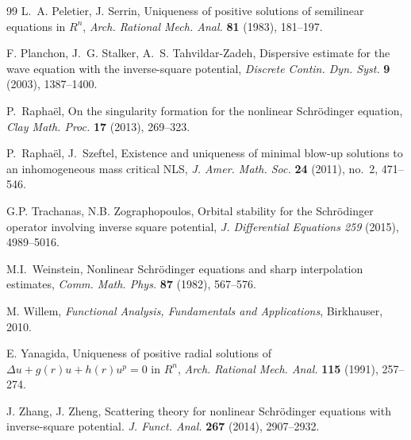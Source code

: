 \documentclass[reqno]{amsart}
\theoremstyle{plain}
\theoremstyle{definition}
\numberwithin{equation}{section}
\begin{document}
\begin{thebibliography}{99}
L.~A. Peletier, J. Serrin,
Uniqueness of positive solutions of semilinear equations in $R^n$,
{\it Arch. Rational Mech. Anal.} {\bf 81} (1983), 181--197.


F. Planchon, J.~G. Stalker, A.~S. Tahvildar-Zadeh,
Dispersive estimate for the wave equation with the inverse-square potential, 
{\it Discrete Contin. Dyn. Syst.} {\bf 9} (2003), 1387--1400. 

 P.~Rapha\"el, On the singularity formation for the nonlinear Schr\"odinger equation,
{\it Clay Math. Proc.} {\bf 17} (2013), 269--323.

 P.~Rapha\"el, J.~Szeftel,
Existence and uniqueness of minimal blow-up solutions to an inhomogeneous mass critical NLS,
{\it J. Amer. Math. Soc.} {\bf 24} (2011), no.~2, 471--546.

 G.P. Trachanas, N.B. Zographopoulos,
Orbital stability for the Schr\"odinger operator involving inverse square potential,
{\it  J. Differential Equations  259 } (2015), 4989--5016.

M.I.~Weinstein,
Nonlinear Schr\"odinger equations and sharp interpolation estimates,
{\it Comm. Math. Phys.} {\bf 87} (1982), 567--576.


M. Willem,
{\it  Functional Analysis, Fundamentals and Applications}, Birkhauser, 2010.

E. Yanagida,
Uniqueness of positive radial solutions of $\Delta u +g(r) u + h(r) u^p =0$ in $R^n$, 
{\it Arch. Rational Mech. Anal.} {\bf 115} (1991), 257--274. 

J. Zhang, J. Zheng, 
Scattering theory for nonlinear Schr\"odinger equations 
with inverse-square potential.
{\it J. Funct. Anal.} {\bf 267} (2014), 2907--2932.




\end{thebibliography}
\end{document}
